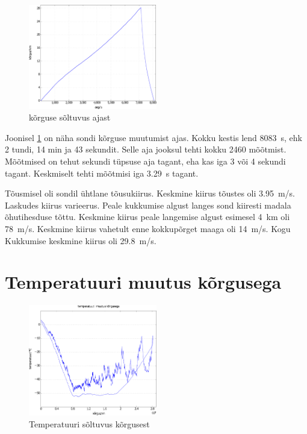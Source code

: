 \documentclass{trkut}%
\begin{document}
\begin{figure}[h]
	\includegraphics[width=0.5\textwidth]{PicGra/kõraeg.pdf}
	\caption{kõrguse sõltuvus ajast}
	\label{kõraeg}
\end{figure}

Joonisel \ref{kõraeg} on näha sondi kõrguse muutumist ajas. Kokku kestis lend \SI{8083}{s}, ehk 2 tundi, 14 min ja 43 sekundit. Selle aja jooksul tehti kokku 2460 mõõtmist. Mõõtmised on tehut sekundi tüpsuse aja tagant, eha kas iga 3 või 4 sekundi tagant. Keskmiselt tehti mõõtmisi iga \SI{3.29}{s} tagant.

Tõusmisel oli sondil ühtlane tõusukiirus. Keskmine kiirus tõustes oli \SI{3.95}{m/s}. Laskudes kiirus varieerus. Peale kukkumise algust langes sond kiiresti madala õhutihesduse tõttu. Keskmine kiirus peale langemise algust esimesel \SI{4}{km} oli \SI{78}{m/s}. Keskmine kiirus vahetult enne kokkupõrget maaga oli \SI{14}{m/s}. Kogu Kukkumise keskmine kiirus oli \SI{29.8}{m/s}.

\section{Temperatuuri muutus kõrgusega}

\begin{figure}[h]
	\includegraphics[width=0.5\textwidth]{PicGra/tempkõr.pdf}
	\caption{Temperatuuri sõltuvus kõrgusest}
	\label{TempKõrgus}%
\end{figure}
\end{document}
